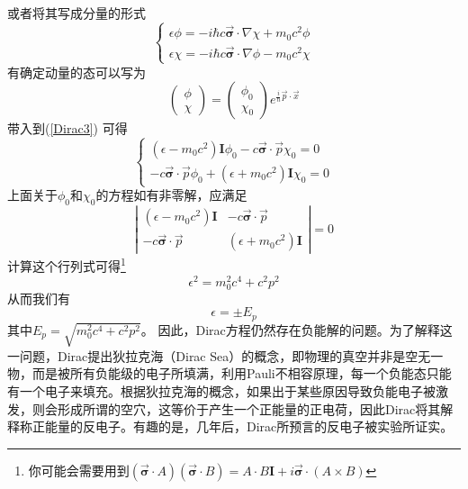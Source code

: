 或者将其写成分量的形式
\begin{equation}
\label{Dirac3}
\left\{
        \begin{array}{ll}
            \epsilon \phi=-i\hbar c \vec{\pmb{\sigma}}\cdot\nabla\chi+m_{0}c^{2}\phi \\
            \epsilon \chi=-i\hbar c \vec{\pmb{\sigma}}\cdot\nabla \phi-m_{0}c^{2}\chi
        \end{array}
    \right.
\end{equation}
有确定动量的态可以写为
\begin{equation}
    \left(
\begin{array}{c}   
    \phi \\  
    \chi 
  \end{array}
\right)=
\left(
\begin{array}{c}   
    \phi_{0} \\  
    \chi_{0} 
  \end{array}
\right)
e^{\frac{i}{\hbar}\vec{p}\cdot \vec{x}}
\end{equation}
带入到(\ref{Dirac3})
可得
\begin{equation}
\label{Dirac4}
\left\{
        \begin{array}{ll}
            (\epsilon-m_{0}c^{2})\pmb{I}\phi_{0}-c\vec{\pmb{\sigma}}\cdot \vec{p}\chi_{0}=0\\
            -c\vec{\pmb{\sigma}}\cdot \vec{p}\phi_{0}+(\epsilon+m_{0}c^{2})\pmb{I}\chi_{0}=0
        \end{array}
    \right.
\end{equation}
上面关于$\phi_{0}$和$\chi_{0}$的方程如有非零解，应满足
\begin{equation}
    \left|
    \begin{array}{cc}
       (\epsilon-m_{0}c^{2})\pmb{I}  & -c\vec{\pmb{\sigma}}\cdot \vec{p}  \\
       -c\vec{\pmb{\sigma}}\cdot \vec{p}  & (\epsilon+m_{0}c^{2})\pmb{I}
    \end{array}
    \right|=0
\end{equation}
计算这个行列式可得\footnote{你可能会需要用到$(\vec{\pmb{\sigma}}\cdot A)(\vec{\pmb{\sigma}}\cdot B)=A\cdot B \pmb{I}+i\vec{\pmb{\sigma}} \cdot (A\times B)$}
\begin{equation}
    \epsilon^{2}=m_{0}^{2}c^{4}+c^{2}{p}^{2}
\end{equation}
从而我们有
\begin{equation}
    \epsilon=\pm E_{p}
\end{equation}
其中$E_{p}=\sqrt{m_{0}^{2}c^{4}+c^{2}{p}^{2}}$。
因此，Dirac方程仍然存在负能解的问题。为了解释这一问题，Dirac提出狄拉克海（Dirac Sea）的概念，即物理的真空并非是空无一物，而是被所有负能级的电子所填满，利用Pauli不相容原理，每一个负能态只能有一个电子来填充。根据狄拉克海的概念，如果出于某些原因导致负能电子被激发，则会形成所谓的空穴，这等价于产生一个正能量的正电荷，因此Dirac将其解释称正能量的反电子。有趣的是，几年后，Dirac所预言的反电子被实验所证实。
